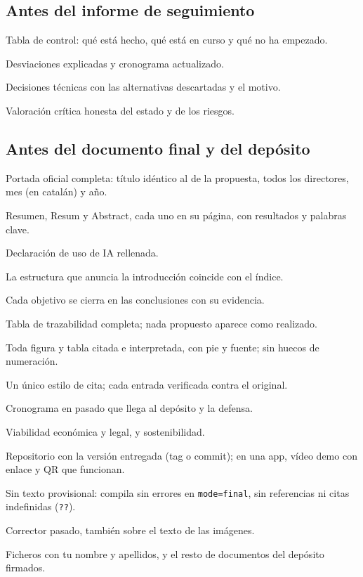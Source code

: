 \documentclass[11pt,a4paper]{article}
\begin{document}
\subsection{Antes del informe de seguimiento}
\begin{checklist}
  \item Tabla de control: qué está hecho, qué está en curso y qué no ha empezado.
  \item Desviaciones explicadas y cronograma actualizado.
  \item Decisiones técnicas con las alternativas descartadas y el motivo.
  \item Valoración crítica honesta del estado y de los riesgos.
\end{checklist}

\subsection{Antes del documento final y del depósito}
\begin{checklist}
  \item Portada oficial completa: título idéntico al de la propuesta, todos los
        directores, mes (en catalán) y año.
  \item Resumen, Resum y Abstract, cada uno en su página, con resultados y
        palabras clave.
  \item Declaración de uso de IA rellenada.
  \item La estructura que anuncia la introducción coincide con el índice.
  \item Cada objetivo se cierra en las conclusiones con su evidencia.
  \item Tabla de trazabilidad completa; nada propuesto aparece como realizado.
  \item Toda figura y tabla citada e interpretada, con pie y fuente; sin
        huecos de numeración.
  \item Un único estilo de cita; cada entrada verificada contra el original.
  \item Cronograma en pasado que llega al depósito y la defensa.
  \item Viabilidad económica y legal, y sostenibilidad.
  \item Repositorio con la versión entregada (tag o commit); en una app, vídeo
        demo con enlace y QR que funcionan.
  \item Sin texto provisional: compila sin errores en \texttt{mode=final}, sin
        referencias ni citas indefinidas (\texttt{??}).
  \item Corrector pasado, también sobre el texto de las imágenes.
  \item Ficheros con tu nombre y apellidos, y el resto de documentos del
        depósito firmados.
\end{checklist}
\end{document}

